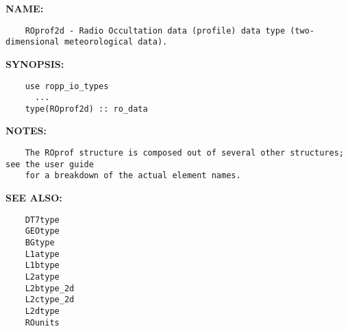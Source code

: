 \label{ch:robo53}
\label{ch:Datatypes_ROprof2d}
\textbf{NAME:}\hspace{0.08in}\begin{Verbatim}
    ROprof2d - Radio Occultation data (profile) data type (two-dimensional meteorological data).
\end{Verbatim}
\textbf{SYNOPSIS:}\hspace{0.08in}\begin{Verbatim}
    use ropp_io_types
      ...
    type(ROprof2d) :: ro_data
\end{Verbatim}
\textbf{NOTES:}\hspace{0.08in}\begin{Verbatim}
    The ROprof structure is composed out of several other structures; see the user guide
    for a breakdown of the actual element names.
\end{Verbatim}
\textbf{SEE ALSO:}\hspace{0.08in}\begin{Verbatim}
    DT7type
    GEOtype
    BGtype
    L1atype
    L1btype
    L2atype
    L2btype_2d
    L2ctype_2d
    L2dtype
    ROunits
\end{Verbatim}
